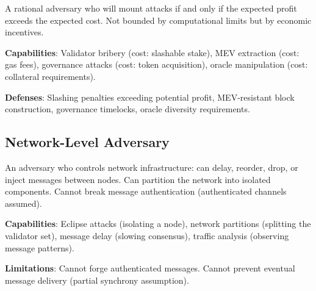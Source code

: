 \begin{definition}
A rational adversary who will mount attacks if and only if the expected profit exceeds
the expected cost. Not bounded by computational limits but by economic incentives.
\end{definition}

\textbf{Capabilities}: Validator bribery (cost: slashable stake), MEV extraction
(cost: gas fees), governance attacks (cost: token acquisition), oracle manipulation
(cost: collateral requirements).

\textbf{Defenses}: Slashing penalties exceeding potential profit, MEV-resistant
block construction, governance timelocks, oracle diversity requirements.

\subsection{Network-Level Adversary}

\begin{definition}
An adversary who controls network infrastructure: can delay, reorder, drop, or
inject messages between nodes. Can partition the network into isolated components.
Cannot break message authentication (authenticated channels assumed).
\end{definition}

\textbf{Capabilities}: Eclipse attacks (isolating a node), network partitions (splitting
the validator set), message delay (slowing consensus), traffic analysis (observing
message patterns).

\textbf{Limitations}: Cannot forge authenticated messages. Cannot prevent eventual
message delivery (partial synchrony assumption).

